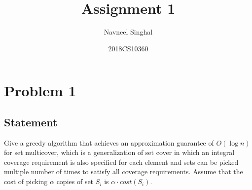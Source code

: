 \documentclass[a4paper]{article}
\title{\textbf{Assignment 1}}
\author{Navneel Singhal}
\date{2018CS10360}
\begin{document}
\maketitle
\tableofcontents

\newpage

\section{Problem 1}
\subsection{Statement}
Give a greedy algorithm that achieves an approximation guarantee of $O(\log n)$ for set multicover, which is a generalization of set cover in which an integral coverage requirement is also specified
for each element and sets can be picked multiple number of times to satisfy all coverage requirements. Assume that the cost of picking $\alpha$ copies of set $S_i$ is $\alpha \cdot cost(S_i)$.
\end{document}
